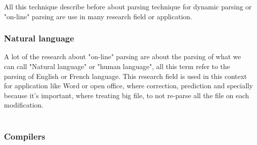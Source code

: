 All this technique describe before about parsing technique for dynamic parsing or "on-line" parsing are use in many research field or application.\\
\subsubsection{Natural language}
A lot of the research about "on-line" parsing are about the parsing of what we can call "Natural language" or "human language", all this term refer to the parsing of English or French language. This research field is used in this context for application like Word or open office, where correction, prediction and specially because it's important, where treating big file, to not re-parse all the file on each modification.\\
\\
\subsubsection{Compilers}